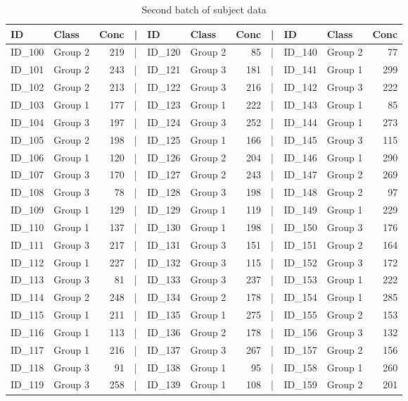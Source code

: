 \documentclass[smallextended]{svjour3}       %
\begin{document}
\begin{table}

\caption{\label{tab:show-table-2}Second batch of subject data}
\centering
\begin{tabular}[t]{llrlllrlllr}
\toprule
ID & Class & Conc & | & ID & Class & Conc & | & ID & Class & Conc\\
\midrule
ID\_100 & Group 2 & 219 & | & ID\_120 & Group 2 & 85 & | & ID\_140 & Group 2 & 77\\
ID\_101 & Group 2 & 243 & | & ID\_121 & Group 3 & 181 & | & ID\_141 & Group 1 & 299\\
ID\_102 & Group 2 & 213 & | & ID\_122 & Group 3 & 216 & | & ID\_142 & Group 3 & 222\\
ID\_103 & Group 1 & 177 & | & ID\_123 & Group 1 & 222 & | & ID\_143 & Group 1 & 85\\
ID\_104 & Group 3 & 197 & | & ID\_124 & Group 3 & 252 & | & ID\_144 & Group 1 & 273\\
\addlinespace
ID\_105 & Group 2 & 198 & | & ID\_125 & Group 1 & 166 & | & ID\_145 & Group 3 & 115\\
ID\_106 & Group 1 & 120 & | & ID\_126 & Group 2 & 204 & | & ID\_146 & Group 1 & 290\\
ID\_107 & Group 3 & 170 & | & ID\_127 & Group 2 & 243 & | & ID\_147 & Group 2 & 269\\
ID\_108 & Group 3 & 78 & | & ID\_128 & Group 3 & 198 & | & ID\_148 & Group 2 & 97\\
ID\_109 & Group 1 & 129 & | & ID\_129 & Group 1 & 119 & | & ID\_149 & Group 1 & 229\\
\addlinespace
ID\_110 & Group 1 & 137 & | & ID\_130 & Group 1 & 198 & | & ID\_150 & Group 3 & 176\\
ID\_111 & Group 3 & 217 & | & ID\_131 & Group 3 & 151 & | & ID\_151 & Group 2 & 164\\
ID\_112 & Group 1 & 227 & | & ID\_132 & Group 3 & 115 & | & ID\_152 & Group 3 & 172\\
ID\_113 & Group 3 & 81 & | & ID\_133 & Group 3 & 237 & | & ID\_153 & Group 1 & 222\\
ID\_114 & Group 2 & 248 & | & ID\_134 & Group 2 & 178 & | & ID\_154 & Group 1 & 285\\
\addlinespace
ID\_115 & Group 1 & 211 & | & ID\_135 & Group 1 & 275 & | & ID\_155 & Group 2 & 153\\
ID\_116 & Group 1 & 113 & | & ID\_136 & Group 2 & 178 & | & ID\_156 & Group 3 & 132\\
ID\_117 & Group 1 & 216 & | & ID\_137 & Group 3 & 267 & | & ID\_157 & Group 2 & 156\\
ID\_118 & Group 3 & 91 & | & ID\_138 & Group 1 & 95 & | & ID\_158 & Group 1 & 260\\
ID\_119 & Group 3 & 258 & | & ID\_139 & Group 1 & 108 & | & ID\_159 & Group 2 & 201\\
\bottomrule
\end{tabular}
\end{table}
\end{document}
